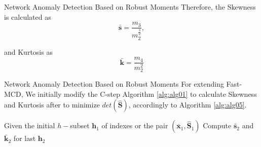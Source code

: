 \documentclass[newPxFont, numfooter, sectionpages]{beamer}
\begin{document}
\begin{frame}{Network Anomaly Detection Based on Robust Moments}
	Therefore, the Skewness is calculated as
	\begin{equation}\label{eq:eq06}
		\boldsymbol{\bar{s}} = \frac{m_3}{m_2^{\frac{3}{2}}},
	\end{equation}

	and Kurtosis as
	\begin{equation}\label{eq:eq07}
		\boldsymbol{\bar{k}} = \frac{m_4}{m_2^2} 
	\end{equation}
\end{frame}

\begin{frame}{Network Anomaly Detection Based on Robust Moments}
	For extending Fast-MCD, We initially modify the C-step Algorithm \ref{alg:alg01} to calculate Skewness and Kurtosis after to minimize $det(\boldsymbol{\hat{S}})$, accordingly to Algorithm \ref{alg:alg05}.
	
	\begin{algorithm}[H]\label{alg:alg05}
		\scriptsize
		\SetAlgoLined
		Given the initial $h-$subset $\boldsymbol{h}_1$ of indexes or the pair $(\boldsymbol{\bar{x}}_1, \boldsymbol{\hat{S}}_1)$\;
		Compute $\boldsymbol{\bar{s}}_2$ and $\boldsymbol{\bar{k}}_2$ for last $\boldsymbol{h}_2$\;
		\caption{C-Step with higher moments}
	\end{algorithm}
\end{frame}
\end{document}
